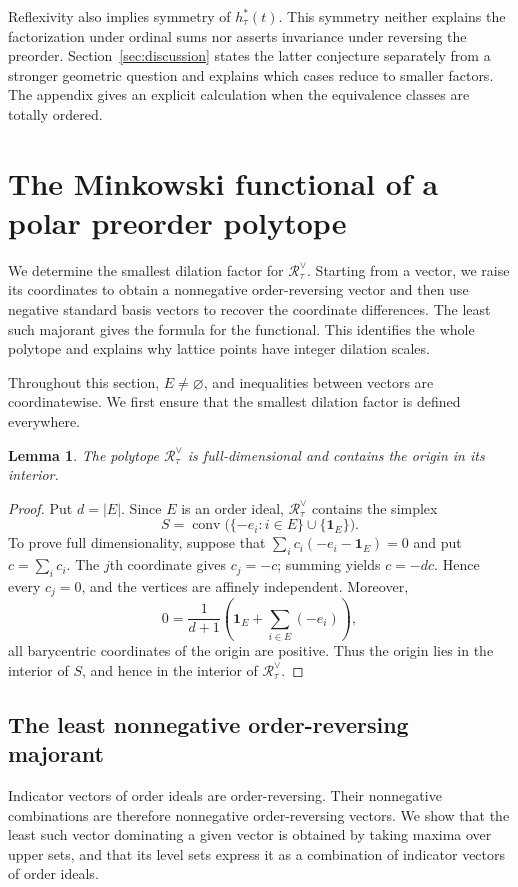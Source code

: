 \documentclass[11pt,reqno]{amsart}
\numberwithin{equation}{section}
\newtheorem{lemma}[theorem]{Lemma}
\theoremstyle{definition}
\theoremstyle{remark}
\theoremstyle{definition}
\newcommand{\Rpoly}[1]{\mathcal R_{#1}^{\vee}}
\DeclareMathOperator{\conv}{conv}
\begin{document}
Reflexivity also implies symmetry of $h_\tau^*(t)$\cite[Theorem~2.1]{HIBI}. This symmetry neither explains the factorization under ordinal sums nor asserts invariance under reversing the preorder. Section~\ref{sec:discussion} states the latter conjecture separately from a stronger geometric question and explains which cases reduce to smaller factors. The appendix gives an explicit calculation when the equivalence classes are totally ordered.

\section{The Minkowski functional of a polar preorder polytope}\label{sec:gauge}
We determine the smallest dilation factor for $\Rpoly{\tau}$. Starting from a vector, we raise its coordinates to obtain a nonnegative order-reversing vector and then use negative standard basis vectors to recover the coordinate differences. The least such majorant gives the formula for the functional. This identifies the whole polytope and explains why lattice points have integer dilation scales.

Throughout this section, $E\ne\varnothing$, and inequalities between vectors are coordinatewise. We first ensure that the smallest dilation factor is defined everywhere.
\begin{lemma}\label{interior}
The polytope $\Rpoly{\tau}$ is full-dimensional and contains the origin in its interior.
\end{lemma}
\begin{proof}
Put $d=|E|$. Since $E$ is an order ideal, $\Rpoly{\tau}$ contains the simplex
\[
 S=\conv\bigl(\{-e_i:i\in E\}\cup\{\mathbf1_E\}\bigr).
\]
To prove full dimensionality, suppose that $\sum_i c_i(-e_i-\mathbf1_E)=0$ and put $c=\sum_i c_i$. The $j$th coordinate gives $c_j=-c$; summing yields $c=-dc$. Hence every $c_j=0$, and the vertices are affinely independent. Moreover,
\[
 0=\frac{1}{d+1}\left(\mathbf1_E+\sum_{i\in E}(-e_i)\right),
\]
all barycentric coordinates of the origin are positive. Thus the origin lies in the interior of $S$, and hence in the interior of $\Rpoly{\tau}$.
\end{proof}

\subsection{The least nonnegative order-reversing majorant}\label{sec:envelope}
Indicator vectors of order ideals are order-reversing. Their nonnegative combinations are therefore nonnegative order-reversing vectors. We show that the least such vector dominating a given vector is obtained by taking maxima over upper sets, and that its level sets express it as a combination of indicator vectors of order ideals.
\end{document}
